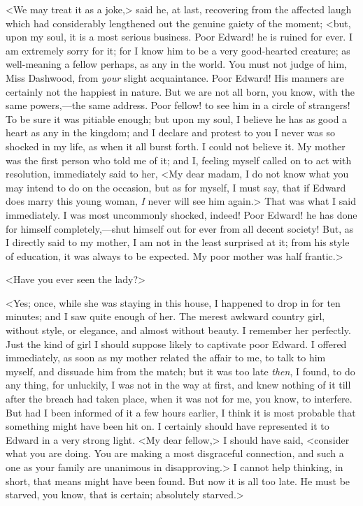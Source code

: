 <We may treat it as a joke,> said he, at last, recovering from the affected laugh which had considerably lengthened out the genuine gaiety of the moment; <but, upon my soul, it is a most serious business. Poor Edward! he is ruined for ever. I am extremely sorry for it; for I know him to be a very good-hearted creature; as well-meaning a fellow perhaps, as any in the world. You must not judge of him, Miss Dashwood, from \textit{your} slight acquaintance. Poor Edward! His manners are certainly not the happiest in nature. But we are not all born, you know, with the same powers,—the same address. Poor fellow! to see him in a circle of strangers! To be sure it was pitiable enough; but upon my soul, I believe he has as good a heart as any in the kingdom; and I declare and protest to you I never was so shocked in my life, as when it all burst forth. I could not believe it. My mother was the first person who told me of it; and I, feeling myself called on to act with resolution, immediately said to her, <My dear madam, I do not know what you may intend to do on the occasion, but as for myself, I must say, that if Edward does marry this young woman, \textit{I} never will see him again.> That was what I said immediately. I was most uncommonly shocked, indeed! Poor Edward! he has done for himself completely,—shut himself out for ever from all decent society! But, as I directly said to my mother, I am not in the least surprised at it; from his style of education, it was always to be expected. My poor mother was half frantic.>

<Have you ever seen the lady?>

<Yes; once, while she was staying in this house, I happened to drop in for ten minutes; and I saw quite enough of her. The merest awkward country girl, without style, or elegance, and almost without beauty. I remember her perfectly. Just the kind of girl I should suppose likely to captivate poor Edward. I offered immediately, as soon as my mother related the affair to me, to talk to him myself, and dissuade him from the match; but it was too late \textit{then}, I found, to do any thing, for unluckily, I was not in the way at first, and knew nothing of it till after the breach had taken place, when it was not for me, you know, to interfere. But had I been informed of it a few hours earlier, I think it is most probable that something might have been hit on. I certainly should have represented it to Edward in a very strong light. <My dear fellow,> I should have said, <consider what you are doing. You are making a most disgraceful connection, and such a one as your family are unanimous in disapproving.> I cannot help thinking, in short, that means might have been found. But now it is all too late. He must be starved, you know, that is certain; absolutely starved.>

